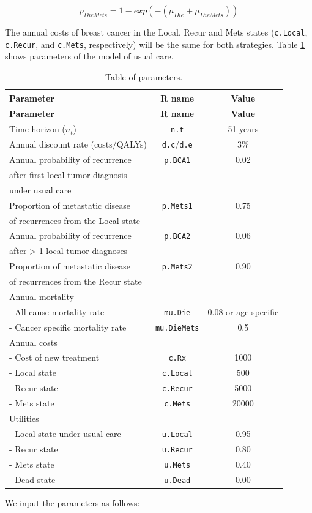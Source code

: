 \documentclass[]{article}
\theoremstyle{definition}
\theoremstyle{definition}
\theoremstyle{definition}
\theoremstyle{remark}
\begin{document}
\[
  p_{DieMets} = 1-exp(-(\mu_{Die}+\mu_{DieMets}))
\]

The annual costs of breast cancer in the Local, Recur and Mets states
(\texttt{c.Local}, \texttt{c.Recur}, and \texttt{c.Mets}, respectively)
will be the same for both strategies. Table \ref{tab:param-table} shows
parameters of the model of usual care.

\begin{longtable}[]{@{}lcc@{}}
\caption{\label{tab:param-table} Table of parameters.}\tabularnewline
\toprule
\textbf{Parameter} & \textbf{R name} & \textbf{Value}\tabularnewline
\midrule
\endfirsthead
\toprule
\textbf{Parameter} & \textbf{R name} & \textbf{Value}\tabularnewline
\midrule
\endhead
Time horizon (\(n_t\)) & \texttt{n.t} & 51 years\tabularnewline
Annual discount rate (costs/QALYs) & \texttt{d.c}/\texttt{d.e} &
3\%\tabularnewline
Annual probability of recurrence & \texttt{p.BCA1} & 0.02\tabularnewline
after first local tumor diagnosis & &\tabularnewline
under usual care & &\tabularnewline
Proportion of metastatic disease & \texttt{p.Mets1} &
0.75\tabularnewline
of recurrences from the Local state & &\tabularnewline
Annual probability of recurrence & \texttt{p.BCA2} & 0.06\tabularnewline
after \textgreater{} 1 local tumor diagnoses & &\tabularnewline
Proportion of metastatic disease & \texttt{p.Mets2} &
0.90\tabularnewline
of recurrences from the Recur state & &\tabularnewline
Annual mortality & &\tabularnewline
- All-cause mortality rate & \texttt{mu.Die} & 0.08 or
age-specific\tabularnewline
- Cancer specific mortality rate & \texttt{mu.DieMets} &
0.5\tabularnewline
Annual costs & &\tabularnewline
- Cost of new treatment & \texttt{c.Rx} & 1000\tabularnewline
- Local state & \texttt{c.Local} & 500\tabularnewline
- Recur state & \texttt{c.Recur} & 5000\tabularnewline
- Mets state & \texttt{c.Mets} & 20000\tabularnewline
Utilities & &\tabularnewline
- Local state under usual care & \texttt{u.Local} & 0.95\tabularnewline
- Recur state & \texttt{u.Recur} & 0.80\tabularnewline
- Mets state & \texttt{u.Mets} & 0.40\tabularnewline
- Dead state & \texttt{u.Dead} & 0.00\tabularnewline
\bottomrule
\end{longtable}

We input the parameters as follows:
\end{document}
